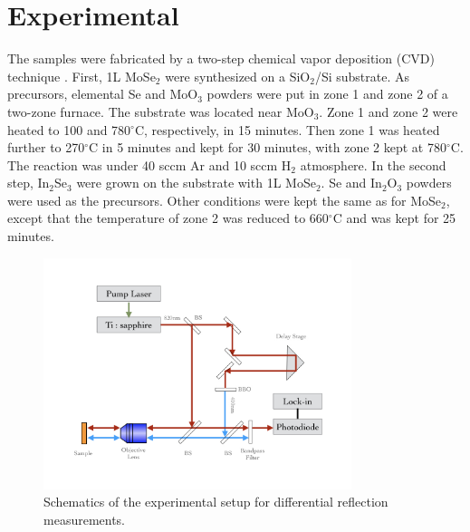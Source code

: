 \documentclass[journal=jacsat,manuscript=article]{achemso}
\begin{document}
\section{Experimental}

The samples were fabricated by a two-step chemical vapor deposition (CVD) technique \cite{cjcp30325}. First, 1L MoSe$_2$ were synthesized on a SiO$_2$/Si substrate. As precursors, elemental Se and MoO$_3$ powders were put in zone 1 and zone 2 of a two-zone furnace. The substrate was located near MoO$_3$. Zone 1 and zone 2 were heated to 100 and 780$^\circ$C, respectively, in 15 minutes. Then zone 1 was heated further to 270$^\circ$C in 5 minutes and kept for 30 minutes, with zone 2 kept at  780$^\circ$C. The reaction was under 40 sccm Ar and 10 sccm H$_2$ atmosphere. In the second step, In$_2$Se$_3$ were grown on the substrate with 1L MoSe$_2$. Se and In$_2$O$_3$ powders were used as the precursors. Other conditions were kept the same as for MoSe$_2$, except that the temperature of zone 2 was reduced to 660$^\circ$C and was kept for 25 minutes. 

\begin{figure}
  \centering
  \includegraphics[width=9cm]{Setup.jpeg}
  \caption{Schematics of the experimental setup for differential reflection measurements.}
    \label{fig:tam}
\end{figure}
\end{document}
